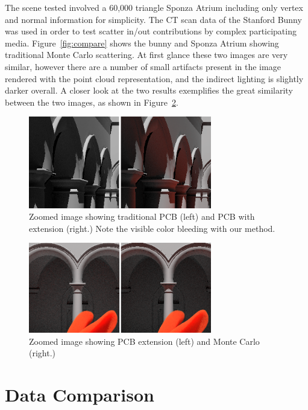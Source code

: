 \documentclass[12pt]{ucthesis}
\begin{document}
The scene tested involved a 60,000 triangle Sponza Atrium including only vertex and normal information for simplicity.  The CT scan data of the Stanford Bunny was used in order to test scatter in/out contributions by complex participating media.
Figure~\ref{fig:compare} shows the bunny and Sponza Atrium showing traditional Monte Carlo scattering.  At first glance these two images are very similar, however there are a number of small artifacts present in the image rendered with the point cloud representation, and the indirect lighting is slightly darker overall.  A closer look at the two results exemplifies the great similarity between the two images, as shown in Figure~\ref{fig:compare_close}.

\begin{figure}[h!]
    \centering
    \includegraphics[width=80mm]{img/compare_trad_corrected.png}
    \caption{Zoomed image showing traditional PCB (left) and PCB with extension (right.)  Note the visible color bleeding with our method.}
    \label{fig:compare_trad}
\end{figure}

\begin{figure}[h!]
    \centering
    \includegraphics[width=80mm]{img/compare1_corrected.png}
    \caption{Zoomed image showing PCB extension (left) and Monte Carlo (right.)}
    \label{fig:compare_close}
\end{figure}

\section{Data Comparison}
\end{document}
